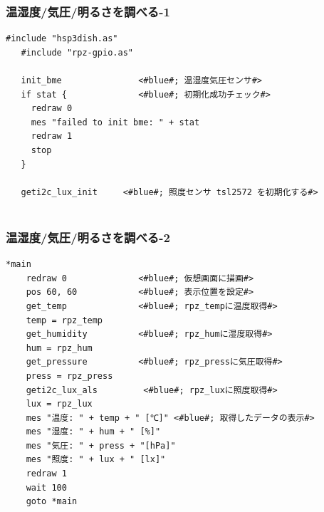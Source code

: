 \documentclass[slide03.tex]{subfiles}
\begin{document}



\begin{frame}[fragile]
  \frametitle{温湿度/気圧/明るさを調べる-1}
  \begin{lstlisting}[title=\sim/03/sensors.hsp 前半, label=sensors.hsp-1]
   #include "hsp3dish.as"    
   #include "rpz-gpio.as"    

   init_bme               <#blue#; 温湿度気圧センサ#>
   if stat {              <#blue#; 初期化成功チェック#>
     redraw 0          
     mes "failed to init bme: " + stat
     redraw 1
     stop
   }

   geti2c_lux_init     <#blue#; 照度センサ tsl2572 を初期化する#>
  
  \end{lstlisting}
\end{frame}

\begin{frame}[fragile]
  \frametitle{温湿度/気圧/明るさを調べる-2}
  \begin{lstlisting}[title=\sim/03/sensors.hsp 後半, label=sensors.hsp-2]
  *main
    redraw 0              <#blue#; 仮想画面に描画#>
    pos 60, 60            <#blue#; 表示位置を設定#>
    get_temp              <#blue#; rpz_tempに温度取得#>
    temp = rpz_temp       
    get_humidity          <#blue#; rpz_humに湿度取得#>
    hum = rpz_hum       
    get_pressure          <#blue#; rpz_pressに気圧取得#>
    press = rpz_press
    geti2c_lux_als         <#blue#; rpz_luxに照度取得#>
    lux = rpz_lux
    mes "温度: " + temp + " [℃]" <#blue#; 取得したデータの表示#>
    mes "湿度: " + hum + " [%]"
    mes "気圧: " + press + "[hPa]"
    mes "照度: " + lux + " [lx]"
    redraw 1              
    wait 100
    goto *main
  \end{lstlisting}
\end{frame}
\end{document}
